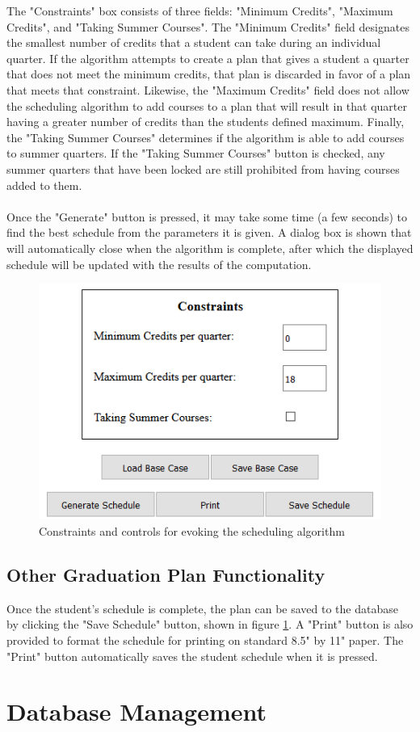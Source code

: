 \documentclass[]{article}
\begin{document}
		 The "Constraints" box consists of three fields: "Minimum Credits", "Maximum Credits", and "Taking Summer Courses". The "Minimum Credits" field designates the smallest number of credits that a student can take during an individual quarter. If the algorithm attempts to create a plan that gives a student a quarter that does not meet the minimum credits, that plan is discarded in favor of a plan that meets that constraint. Likewise, the "Maximum Credits" field does not allow the scheduling algorithm to add courses to a plan that will result in that quarter having a greater number of credits than the students defined maximum. Finally, the "Taking Summer Courses" determines if the algorithm is able to add courses to summer quarters. If the "Taking Summer Courses" button is checked, any summer quarters that have been locked are still prohibited from having courses added to them.\\~\\
		
		Once the "Generate" button is pressed, it may take some time (a few seconds) to find the best schedule from the parameters it is given. A dialog box is shown that will automatically close when the algorithm is complete, after which the displayed schedule will be updated with the results of the computation. 
		\begin{figure}[H]
			\caption{Constraints and controls for evoking the scheduling algorithm}
			\label{algorithmbutton}
			\centering
			\includegraphics{schedulingalgorithm.PNG}
		\end{figure}
	\subsection{Other Graduation Plan Functionality}\label{ssec:11}
		Once the student's schedule is complete, the plan can be saved to the database by clicking the "Save Schedule" button, shown in figure \ref{algorithmbutton}. A "Print" button is also provided to format the schedule for printing on standard 8.5" by 11" paper. The "Print" button automatically saves the student schedule when it is pressed. 
\pagebreak\section{Database Management}
\end{document}
